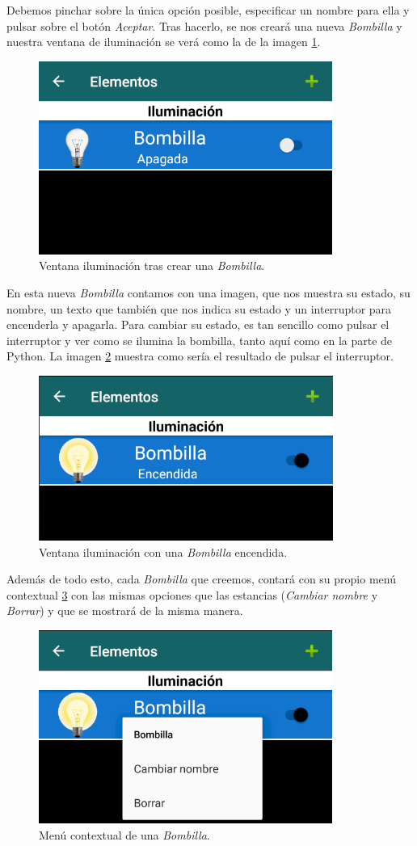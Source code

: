 Debemos pinchar sobre la única opción posible, especificar un nombre para ella y pulsar sobre el botón \textit{Aceptar}. Tras hacerlo, se nos creará una nueva \textit{Bombilla} y nuestra ventana de iluminación se verá como la de la imagen \ref{fig:ventanaIluminacion2}.

\begin{figure}[h!]
	\centering
	\includegraphics[width=0.6\linewidth]{img/ventanaIluminacion2}
	\caption{Ventana iluminación tras crear una \textit{Bombilla}.}
	\label{fig:ventanaIluminacion2}
\end{figure}

En esta nueva \textit{Bombilla} contamos con una imagen, que nos muestra su estado, su nombre, un texto que también que nos indica su estado y un interruptor para encenderla y apagarla. Para cambiar su estado, es tan sencillo como pulsar el interruptor y ver como se ilumina la bombilla, tanto aquí como en la parte de Python. La imagen \ref{fig:bombillaIluminada} muestra como sería el resultado de pulsar el interruptor.

\begin{figure}[h!]
	\centering
	\includegraphics[width=0.6\linewidth]{img/bombillaIluminada}
	\caption{Ventana iluminación con una \textit{Bombilla} encendida.}
	\label{fig:bombillaIluminada}
\end{figure}

Además de todo esto, cada \textit{Bombilla} que creemos, contará con su propio menú contextual \ref{fig:menuContextualBombilla} con las mismas opciones que las estancias (\textit{Cambiar nombre} y \textit{Borrar})  y que se mostrará de la misma manera.

\begin{figure}[h!]
	\centering
	\includegraphics[width=0.6\linewidth]{img/menuContextualBombilla}
	\caption{Menú contextual de una \textit{Bombilla}.}
	\label{fig:menuContextualBombilla}
\end{figure}